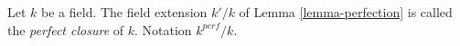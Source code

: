 \begin{definition}
\label{definition-perfection}
Let $k$ be a field. The field extension $k'/k$ of Lemma \ref{lemma-perfection}
is called the {\it perfect closure} of $k$. Notation $k^{perf}/k$.
\end{definition}